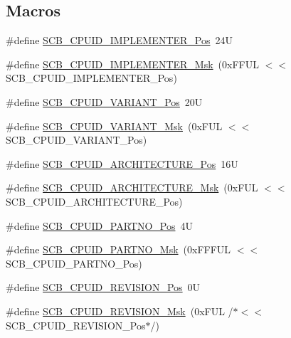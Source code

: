 \subsection*{Macros}
\begin{DoxyCompactItemize}
\item 
\#define \hyperlink{group___c_m_s_i_s___s_c_b_ga58686b88f94f789d4e6f429fe1ff58cf}{S\+C\+B\+\_\+\+C\+P\+U\+I\+D\+\_\+\+I\+M\+P\+L\+E\+M\+E\+N\+T\+E\+R\+\_\+\+Pos}~24U
\item 
\#define \hyperlink{group___c_m_s_i_s___s_c_b_ga0932b31faafd47656a03ced75a31d99b}{S\+C\+B\+\_\+\+C\+P\+U\+I\+D\+\_\+\+I\+M\+P\+L\+E\+M\+E\+N\+T\+E\+R\+\_\+\+Msk}~(0x\+F\+F\+U\+L $<$$<$ S\+C\+B\+\_\+\+C\+P\+U\+I\+D\+\_\+\+I\+M\+P\+L\+E\+M\+E\+N\+T\+E\+R\+\_\+\+Pos)
\item 
\#define \hyperlink{group___c_m_s_i_s___s_c_b_ga104462bd0815391b4044a70bd15d3a71}{S\+C\+B\+\_\+\+C\+P\+U\+I\+D\+\_\+\+V\+A\+R\+I\+A\+N\+T\+\_\+\+Pos}~20U
\item 
\#define \hyperlink{group___c_m_s_i_s___s_c_b_gad358dfbd04300afc1824329d128b99e8}{S\+C\+B\+\_\+\+C\+P\+U\+I\+D\+\_\+\+V\+A\+R\+I\+A\+N\+T\+\_\+\+Msk}~(0x\+F\+U\+L $<$$<$ S\+C\+B\+\_\+\+C\+P\+U\+I\+D\+\_\+\+V\+A\+R\+I\+A\+N\+T\+\_\+\+Pos)
\item 
\#define \hyperlink{group___c_m_s_i_s___s_c_b_gaf8b3236b08fb8e840efb682645fb0e98}{S\+C\+B\+\_\+\+C\+P\+U\+I\+D\+\_\+\+A\+R\+C\+H\+I\+T\+E\+C\+T\+U\+R\+E\+\_\+\+Pos}~16U
\item 
\#define \hyperlink{group___c_m_s_i_s___s_c_b_gafae4a1f27a927338ae9dc51a0e146213}{S\+C\+B\+\_\+\+C\+P\+U\+I\+D\+\_\+\+A\+R\+C\+H\+I\+T\+E\+C\+T\+U\+R\+E\+\_\+\+Msk}~(0x\+F\+U\+L $<$$<$ S\+C\+B\+\_\+\+C\+P\+U\+I\+D\+\_\+\+A\+R\+C\+H\+I\+T\+E\+C\+T\+U\+R\+E\+\_\+\+Pos)
\item 
\#define \hyperlink{group___c_m_s_i_s___s_c_b_ga705f68eaa9afb042ca2407dc4e4629ac}{S\+C\+B\+\_\+\+C\+P\+U\+I\+D\+\_\+\+P\+A\+R\+T\+N\+O\+\_\+\+Pos}~4U
\item 
\#define \hyperlink{group___c_m_s_i_s___s_c_b_ga98e581423ca016680c238c469aba546d}{S\+C\+B\+\_\+\+C\+P\+U\+I\+D\+\_\+\+P\+A\+R\+T\+N\+O\+\_\+\+Msk}~(0x\+F\+F\+F\+U\+L $<$$<$ S\+C\+B\+\_\+\+C\+P\+U\+I\+D\+\_\+\+P\+A\+R\+T\+N\+O\+\_\+\+Pos)
\item 
\#define \hyperlink{group___c_m_s_i_s___s_c_b_ga3c3d9071e574de11fb27ba57034838b1}{S\+C\+B\+\_\+\+C\+P\+U\+I\+D\+\_\+\+R\+E\+V\+I\+S\+I\+O\+N\+\_\+\+Pos}~0U
\item 
\#define \hyperlink{group___c_m_s_i_s___s_c_b_ga2ec0448b6483f77e7f5d08b4b81d85df}{S\+C\+B\+\_\+\+C\+P\+U\+I\+D\+\_\+\+R\+E\+V\+I\+S\+I\+O\+N\+\_\+\+Msk}~(0x\+F\+U\+L /$\ast$$<$$<$ S\+C\+B\+\_\+\+C\+P\+U\+I\+D\+\_\+\+R\+E\+V\+I\+S\+I\+O\+N\+\_\+\+Pos$\ast$/)

\end{DoxyCompactItemize}
